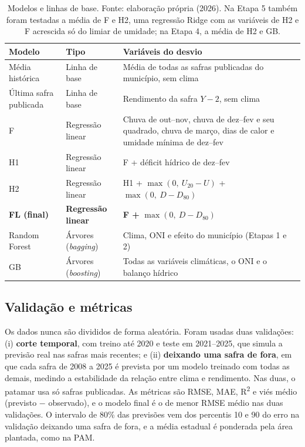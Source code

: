 \documentclass[12pt]{article}
\begin{document}
\begin{table}[ht]
\centering
\caption{Modelos e linhas de base. Fonte: elaboração própria (2026). Na
  Etapa 5 também foram testadas a média de F e H2, uma regressão Ridge com
  as variáveis de H2 e F acrescida só do limiar de umidade; na Etapa 4, a
  média de H2 e GB.}
\label{tab:modelos}
\begin{tabular}{|p{3.2cm}|p{2.8cm}|p{7.3cm}|}
\hline
\textbf{Modelo} & \textbf{Tipo} & \textbf{Variáveis do desvio} \\ \hline
Média histórica & Linha de base & Média de todas as safras publicadas do
  município, sem clima \\ \hline
Última safra publicada & Linha de base & Rendimento da safra $Y-2$, sem
  clima \\ \hline
F & Regressão linear & Chuva de out--nov, chuva de dez--fev e seu
  quadrado, chuva de março, dias de calor e umidade mínima de dez--fev
  \\ \hline
H1 & Regressão linear & F + déficit hídrico de dez--fev \\ \hline
H2 & Regressão linear & H1 + $\max(0,\ U_{20} - U)$ + $\max(0,\ D -
  D_{80})$ \\ \hline
\textbf{FL (final)} & \textbf{Regressão linear} & \textbf{F +}
  $\max(0,\ D - D_{80})$ \\ \hline
Random Forest \cite{breiman2001} & Árvores (\emph{bagging}) & Clima, ONI
  e efeito do município (Etapas 1 e 2) \\ \hline
GB \cite{friedman2001} & Árvores (\emph{boosting}) & Todas as variáveis
  climáticas, o ONI e o balanço hídrico \\ \hline
\end{tabular}
\end{table}

\subsection{Validação e métricas}

Os dados nunca são divididos de forma aleatória. Foram usadas duas
validações: (i) \textbf{corte temporal}, com treino até 2020 e teste em
2021--2025, que simula a previsão real nas safras mais recentes; e (ii)
\textbf{deixando uma safra de fora}, em que cada safra de 2008 a 2025 é
prevista por um modelo treinado com todas as demais, medindo a
estabilidade da relação entre clima e rendimento. Nas duas, o patamar usa
só safras publicadas. As métricas são RMSE, MAE, R\textsuperscript{2} e
viés médio (previsto $-$ observado), e o modelo final é o de menor RMSE
médio nas duas validações. O intervalo de 80\% das previsões vem dos
percentis 10 e 90 do erro na validação deixando uma safra de fora, e a
média estadual é ponderada pela área plantada, como na PAM.
\end{document}
